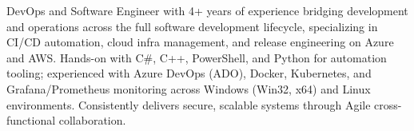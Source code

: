 

\begin{cvparagraph}

DevOps and Software Engineer with 4+ years of experience bridging development and operations across the full software development lifecycle, specializing in CI/CD automation, cloud infra management, and release engineering on Azure and AWS. Hands-on with C\#, C++, PowerShell, and Python for automation tooling; experienced with Azure DevOps (ADO), Docker, Kubernetes, and Grafana/Prometheus monitoring across Windows (Win32, x64) and Linux environments. Consistently delivers secure, scalable systems through Agile cross-functional collaboration.
\end{cvparagraph}